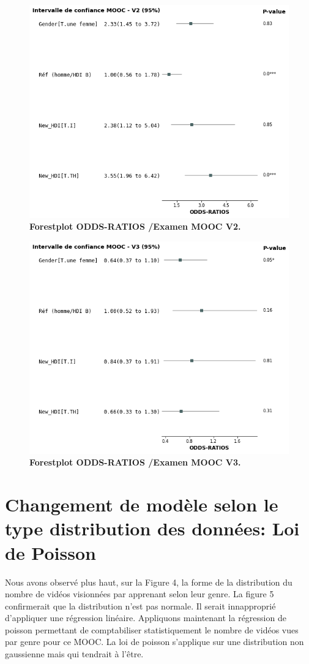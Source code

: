 \documentclass[12pt, a4paper, titlepage, table]{article}
\begin{document}
\begin{figure}[H]
	\centering
	\includegraphics[width=1\textwidth]{../../graph/forestplot_v2.png}
	\caption{\textbf{Forestplot ODDS-RATIOS /Examen MOOC V2.}}
\end{figure}

\begin{figure}[H]
	\centering
	\includegraphics[width=1\textwidth]{../../graph/forestplot_v3.png}
	\caption{\textbf{Forestplot ODDS-RATIOS /Examen MOOC V3.}}
\end{figure}

\section{Changement de modèle selon le type distribution des données: Loi de Poisson}
Nous avons observé plus haut, sur la Figure 4, la forme de la distribution du nombre de vidéos visionnées par apprenant 
selon leur genre.
La figure 5 confirmerait que la distribution n'est pas normale. Il serait innapproprié d'appliquer une régression linéaire.
Appliquons maintenant la régression de poisson permettant de comptabiliser statistiquement le nombre de vidéos vues par
genre pour ce MOOC. La loi de poisson s'applique sur une distribution non gaussienne mais qui tendrait à l'être.
\end{document}
